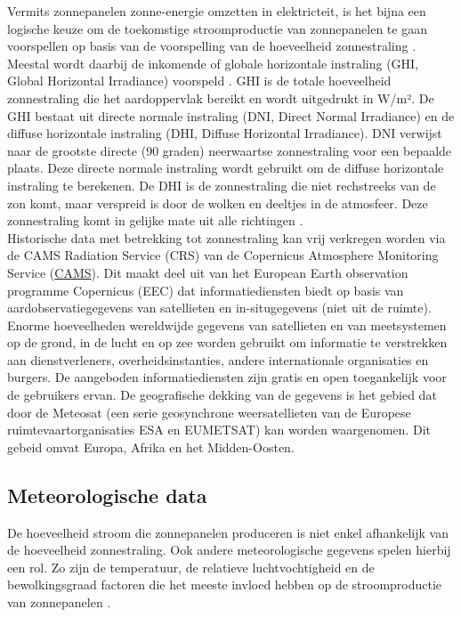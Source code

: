 Vermits zonnepanelen zonne-energie omzetten in elektricteit, is het bijna een logische keuze om de toekomstige stroomproductie van zonnepanelen te gaan voorspellen op basis van de voorspelling van de hoeveelheid zonnestraling \autocite{Ledmaoui2023}. Meestal wordt daarbij de inkomende of globale horizontale instraling (GHI, Global Horizontal Irradiance) voorspeld . GHI is de totale hoeveelheid zonnestraling die het aardoppervlak bereikt en wordt uitgedrukt in W/m². De GHI bestaat uit directe normale instraling (DNI, Direct Normal Irradiance)  en de diffuse horizontale instraling (DHI, Diffuse Horizontal Irradiance). DNI verwijst naar de grootste directe (90 graden) neerwaartse zonnestraling voor een bepaalde plaats. Deze directe normale instraling wordt gebruikt om de diffuse horizontale instraling te berekenen. De DHI is de zonnestraling die niet rechstreeks van de zon komt, maar verspreid is door de wolken en deeltjes in de atmosfeer. Deze zonnestraling komt in gelijke mate uit alle richtingen \autocite{Sehrawat2023}. \\

Historische data met betrekking tot zonnestraling kan vrij verkregen worden via de CAMS Radiation Service (CRS) van de Copernicus Atmosphere Monitoring Service (\href{https://atmosphere.copernicus.eu}{CAMS}). Dit maakt deel uit van het European Earth observation programme Copernicus (EEC) dat informatiediensten biedt op basis van aardobservatiegegevens van satellieten en in-situgegevens (niet uit de ruimte). Enorme hoeveelheden wereldwijde gegevens van satellieten en van meetsystemen op de grond, in de lucht en op zee worden gebruikt om informatie te verstrekken aan dienstverleners, overheidsinstanties, andere internationale organisaties en burgers. De aangeboden informatiediensten zijn gratis en open toegankelijk voor de gebruikers ervan. De geografische dekking van de gegevens is het gebied dat door de Meteosat (een serie geosynchrone weersatellieten van de Europese ruimtevaartorganisaties ESA en EUMETSAT) kan worden waargenomen. Dit gebeid omvat Europa, Afrika en het Midden-Oosten.

\subsection{Meteorologische data}

De hoeveelheid stroom die zonnepanelen produceren is niet enkel afhankelijk van de hoeveelheid zonnestraling. Ook andere meteorologische gegevens spelen hierbij een rol. Zo zijn de temperatuur, de relatieve luchtvochtigheid en de bewolkingsgraad factoren die het meeste invloed hebben op de stroomproductie van zonnepanelen \autocite{Sehrawat2023}. \\

